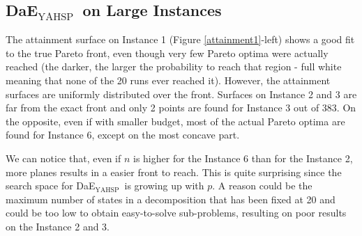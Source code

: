 \documentclass{llncs}
\newcommand{\DAEYAHSP}{{\sc DaE$_{\text{YAHSP}}$}}
\begin{document}
\subsection{\DAEYAHSP\ on Large Instances}
\vspace{-0.1cm}
The attainment surface on Instance 1 (Figure \ref{attainment1}-left) shows a good fit to the true  Pareto front, even though very few Pareto optima were actually reached (the darker, the larger the probability to reach that region - full white meaning that none of the 20 runs ever reached it). However, the attainment surfaces are uniformly distributed over the front. Surfaces on Instance 2 and 3 are far from the exact front and only 2 points are found for Instance 3 out of 383. On the opposite, even if with smaller budget, most of the actual Pareto optima are found for Instance 6, except on the most concave part. 

We can notice that, even if $n$ is higher for the Instance 6 than for the Instance 2, more planes results in a easier front to reach. This is quite surprising since the search space for \DAEYAHSP\ is growing up with $p$. A reason could be the maximum number of states in a decomposition that has been fixed at 20 and could be too low to obtain easy-to-solve sub-problems, resulting on poor results on the Instance 2 and 3.

\end{document}
